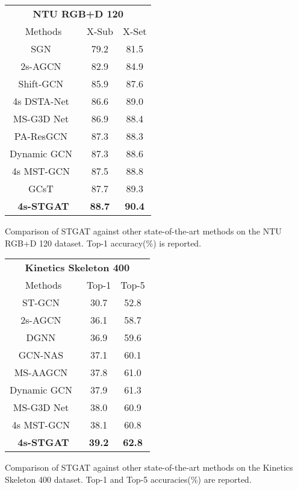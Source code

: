 \documentclass[runningheads]{llncs}
\begin{document}
\begin{minipage}{\textwidth}
\begin{minipage}[t]{0.46\textwidth}
\makeatletter{}
\centering
\begin{tabular}{ccc} 
    \hline
    \multicolumn{3}{c}{\textbf{NTU RGB+D 120}}\\
    Methods & X-Sub & X-Set\\
    \hline
SGN~\cite{zhang2020semantics}	& 79.2	& 81.5\\
    2s-AGCN~\cite{shi2019two} &  82.9 & 84.9 \\
    Shift-GCN~\cite{cheng2020skeleton} & 85.9 & 87.6 \\
    4s DSTA-Net~\cite{shi2020decoupled} & 86.6 & 89.0 \\
    MS-G3D Net~\cite{liu2020disentangling} &  86.9 & 88.4\\
    PA-ResGCN~\cite{song2020stronger} & 87.3 & 88.3 \\
    Dynamic GCN~\cite{ye2020dynamic} &   87.3  &  88.6\\
    4s MST-GCN~\cite{chen2021multi} &87.5& 88.8 \\
    GCsT~\cite{bai2021gcst} & 87.7 & 89.3 \\
    \hline
    \textbf{4s-STGAT} & \textbf{88.7} &  \textbf{90.4} \\
    \hline
    \end{tabular}    
    \caption{Comparison of STGAT against other state-of-the-art methods on the NTU RGB+D 120 dataset. Top-1 accuracy(\%) is reported.} 
    \label{table6}
\end{minipage}
\begin{minipage}[t]{0.46\textwidth}
\makeatletter{}
\centering
\begin{tabular}{ccc} 
    \hline
    \multicolumn{3}{c}{\textbf{Kinetics Skeleton 400}} \\
    Methods & Top-1 & Top-5 \\
    \hline
    ST-GCN~\cite{yan2018spatial} &  30.7 & 52.8\\
2s-AGCN~\cite{shi2019two} &  36.1 & 58.7\\
    DGNN~\cite{shi2019skeleton1} &  36.9 & 59.6\\
    GCN-NAS~\cite{peng2020learning} & 37.1 & 60.1 \\
    MS-AAGCN~\cite{shi2019skeleton} & 37.8 & 61.0\\
    Dynamic GCN~\cite{ye2020dynamic} &  37.9 & 61.3\\
    MS-G3D Net~\cite{liu2020disentangling} & 38.0 & 60.9\\
    4s MST-GCN~\cite{chen2021multi} &38.1& 60.8 \\
    \hline
    \textbf{4s-STGAT} & \textbf{39.2} & \textbf{62.8}  \\
    \hline
    \end{tabular}    
    \caption{Comparison of STGAT against other state-of-the-art methods on the Kinetics Skeleton 400 dataset. Top-1 and Top-5 accuracies(\%) are reported.} 
    \label{table7}
\end{minipage}
\end{minipage}
  
\end{document}
